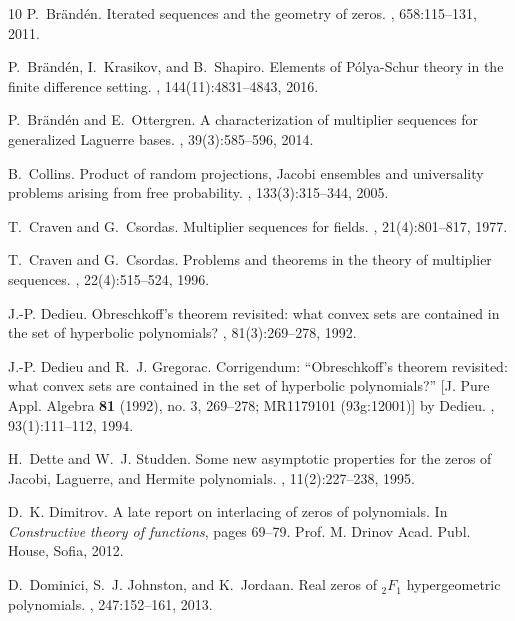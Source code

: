 \documentclass[reqno,11pt]{amsart}
\theoremstyle{remark}
\begin{document}
\begin{thebibliography}{10}
	P.~Br{\"{a}}nd\'{e}n.
	\newblock Iterated sequences and the geometry of zeros.
	, 658:115--131, 2011.
	
	P.~Br{\"a}nd{\'e}n, I.~Krasikov, and B.~Shapiro.
	\newblock Elements of {P{\'o}lya}-{Schur} theory in the finite difference setting.
	, 144(11):4831--4843, 2016.
	
	P.~Br{\"{a}}nd\'{e}n and E.~Ottergren.
	\newblock A characterization of multiplier sequences for generalized {L}aguerre bases.
	, 39(3):585--596, 2014.
	
	B.~Collins.
	\newblock Product of random projections, {J}acobi ensembles and universality problems arising from free probability.
	, 133(3):315--344, 2005.
	
	T.~Craven and G.~Csordas.
	\newblock Multiplier sequences for fields.
	, 21(4):801--817, 1977.
	
	T.~Craven and G.~Csordas.
	\newblock Problems and theorems in the theory of multiplier sequences.
	, 22(4):515--524, 1996.
	
	J.-P. Dedieu.
	\newblock Obreschkoff's theorem revisited: what convex sets are contained in the set of hyperbolic polynomials?
	, 81(3):269--278, 1992.
	
	J.-P. Dedieu and R.~J. Gregorac.
	\newblock Corrigendum: ``{O}breschkoff's theorem revisited: what convex sets are contained in the set of hyperbolic polynomials?'' [{J}. {P}ure {A}ppl.
	{A}lgebra {\bf 81} (1992), no. 3, 269--278; {MR}1179101 (93g:12001)] by {D}edieu.
	, 93(1):111--112, 1994.
	
	H.~Dette and W.~J. Studden.
	\newblock Some new asymptotic properties for the zeros of {J}acobi, {L}aguerre, and {H}ermite polynomials.
	, 11(2):227--238, 1995.
	
	D.~K. Dimitrov.
	\newblock A late report on interlacing of zeros of polynomials.
	\newblock In {\em Constructive theory of functions}, pages 69--79. Prof. M. Drinov Acad. Publ. House, Sofia, 2012.
	
	D.~Dominici, S.~J. Johnston, and K.~Jordaan.
	\newblock Real zeros of {$_2F_1$} hypergeometric polynomials.
	, 247:152--161, 2013.
	

\end{thebibliography}
\end{document}
